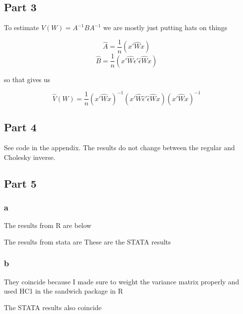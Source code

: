\documentclass[11pt]{article}
\begin{document}
\subsection{Part 3}

To estimate $V(W) = A^{-1}BA^{-1} $ we are mostly just putting hats on things 

$$\hat{A} = \frac{1}{n}(x'\hat{W}x)$$ 
$$\hat{B} = \frac{1}{n}(x'\hat{W} \hat{\epsilon}' \hat{\epsilon} \hat{W}x)$$

 so that gives us 
 
 $$ \hat{V}(W) = \frac{1}{n} (x'\hat{W}x)^{-1} (x'\hat{W} \hat{\epsilon}' \hat{\epsilon} \hat{W}x) (x'\hat{W}x)^{-1} $$
 
 \subsection{Part 4}
 
 See code in the appendix. The results do not change between the regular and Cholesky inverse. 
 
  \subsection{Part 5}
  
 	\subsubsection{a}
 	
 	The results from R are below
 	\begin{center}
 		
 	\end{center}
 
 	The results from stata are 
 	These are the STATA results 
 	
 	\begin{center}
 		
 		
 	\end{center}
 	
 
 	\subsubsection{b}
 	They coincide because I made sure to weight the variance matrix properly and used HC1 in the sandwich package in R
 		\begin{center}
 		
 	\end{center}
 
 The STATA results also coincide 
  		\begin{center}
 	
 \end{center}
\end{document}
